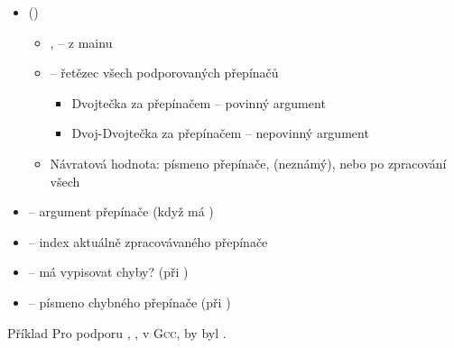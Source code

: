 \begin{frame}{}

  \begin{itemize}
    \item {} ()
    \begin{itemize}
      \item {},  -- z mainu
      \item {} -- řetězec všech podporovaných přepínačů
      \begin{itemize}
	\item Dvojtečka za přepínačem -- povinný argument
	\item Dvoj-Dvojtečka za přepínačem -- nepovinný argument
      \end{itemize}

      \pause

      \item Návratová hodnota: písmeno přepínače,  (neznámý), nebo
         po zpracování všech
    \end{itemize}

    \pause

    \item {} -- argument přepínače (když má )

    \pause

    \item {} -- index aktuálně zpracovávaného přepínače

    \pause

    \item {} -- má  vypisovat chyby? (při
      )
    \item {} -- písmeno chybného přepínače (při
      )
  \end{itemize}

  \pause

  \begin{block}{Příklad }
Pro podporu , ,  v \textsc{Gcc}, by 
byl .
  \end{block}

\end{frame}

